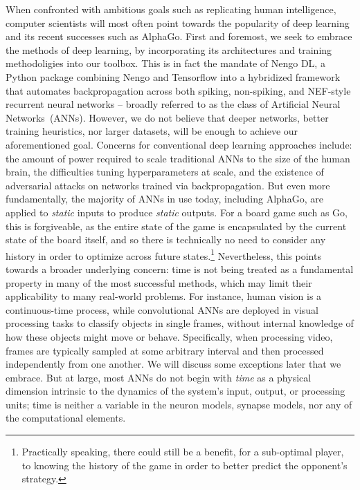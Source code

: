 When confronted with ambitious goals such as replicating human intelligence, computer scientists will most often point towards
the popularity of deep learning and its recent successes such as AlphaGo.
First and foremost, we seek to embrace the methods of deep learning, by incorporating its architectures and training methodoligies into our toolbox.
This is in fact the mandate of Nengo DL, a Python package combining Nengo and Tensorflow into a hybridized framework that automates backpropagation across both spiking, non-spiking, and NEF-style recurrent neural networks -- broadly referred to as the class of Artificial Neural Networks~(ANNs).
However, we do not believe that deeper networks, better training heuristics, nor larger datasets, will be enough to achieve our aforementioned goal.
Concerns for conventional deep learning approaches include: the amount of power required to scale traditional ANNs to the size of the human brain, the difficulties tuning hyperparameters at scale, and the existence of adversarial attacks on networks trained via backpropagation.
But even more fundamentally, the majority of ANNs in use today, including AlphaGo, are applied to \emph{static} inputs to produce \emph{static} outputs.
For a board game such as Go, this is forgiveable, as the entire state of the game is encapsulated by the current state of the board itself, and so there is technically no need to consider any history in order to optimize across future states.\footnote{
Practically speaking, there could still be a benefit, for a sub-optimal player, to knowing the history of the game in order to better predict the opponent's strategy.}
Nevertheless, this points towards a broader underlying concern: time is not being treated as a fundamental property in many of the most successful methods, which may limit their applicability to many real-world problems.
For instance, human vision is a continuous-time process, while convolutional ANNs are deployed in visual processing tasks to classify objects in single frames, without internal knowledge of how these objects might move or behave.
Specifically, when processing video, frames are typically sampled at some arbitrary interval and then processed independently from one another.
We will discuss some exceptions later that we embrace.
But at large, most ANNs do not begin with {\it time} as a physical dimension intrinsic to the dynamics of the system's input, output, or processing units;
time is neither a variable in the neuron models, synapse models, nor any of the computational elements.

